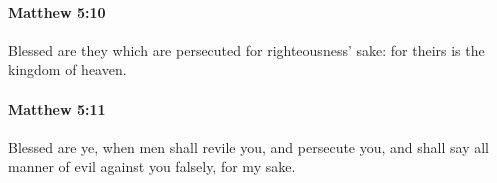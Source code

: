 		\paragraph{Matthew 5:10} %
			\label{MATTHEW-5-10}

			Blessed are they which are persecuted for righteousness' sake: for theirs is the kingdom of heaven.

			\begin{framed}
			\scriptsize
				\begin{compactdesc}
					\item[SBLG] \hyperref[MAKARIOS]{} 
				\end{compactdesc}
			\end{framed}

		\paragraph{Matthew 5:11} %
			\label{MATTHEW-5-11}

			Blessed are ye, when men shall revile you, and persecute you, and shall say all manner of evil against you falsely, for my sake.

